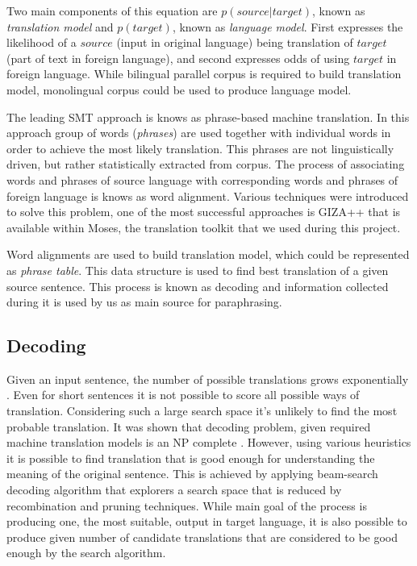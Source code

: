 Two main components of this equation are $p(source|target)$, known as \textit{translation model} and $p(target)$, known as \textit{language model}. First expresses the likelihood of a $source$ (input in original language) being translation of $target$ (part of text in foreign language), and second expresses odds of using $target$ in foreign language. While bilingual parallel corpus is required to build translation model, monolingual corpus could be used to produce language model. 

The leading SMT approach is knows as phrase-based machine translation. In this approach group of words (\textit{phrases}) are used together with individual words in order to achieve the most likely translation. This phrases are not linguistically driven, but rather statistically extracted from corpus. The process of associating words and phrases of source language with corresponding words and phrases of foreign language is knows as word alignment. Various techniques were introduced to solve this problem, one of the most successful approaches is GIZA++ that is available within Moses, the translation toolkit that we used during this project.

Word alignments are used to build translation model, which could be represented as \textit{phrase table}. This data structure is used to find best translation of a given source sentence. This process is known as decoding and information collected during it is used by us as main source for paraphrasing.

\subsection{Decoding}

Given an input sentence, the number of possible translations grows exponentially \cite{Koehn2009a}. Even for short sentences it is not possible to score all possible ways of translation. Considering such a large search space it's unlikely to find the most probable translation. It was shown that decoding problem, given required machine translation models is an NP complete \cite{knight1999decoding}. However, using various heuristics it is possible to find translation that is good enough for understanding the meaning of the original sentence. This is achieved by applying beam-search decoding algorithm that explorers a search space that is reduced by recombination and pruning techniques. While main goal of the process is producing one, the most suitable, output in target language, it is also possible to produce given number of candidate translations that are considered to be good enough by the search algorithm.


